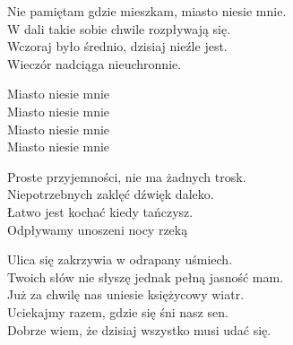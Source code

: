 \begin{text}
    Nie pamiętam gdzie mieszkam, miasto niesie mnie.\\
    W dali takie sobie chwile rozpływają się.\\
    Wczoraj było średnio, dzisiaj nieźle jest.\\
    Wieczór nadciąga nieuchronnie.

    \vin Miasto niesie mnie\\
    \vin Miasto niesie mnie\\
    \vin Miasto niesie mnie\\
    \vin Miasto niesie mnie

    Proste przyjemności, nie ma żadnych trosk.\\
    Niepotrzebnych zaklęć dźwięk daleko.\\
    Łatwo jest kochać kiedy tańczysz.\\
    Odpływamy unoszeni nocy rzeką

    Ulica się zakrzywia w odrapany uśmiech.\\
    Twoich słów nie słyszę jednak pełną jasność mam.\\
    Już za chwilę nas uniesie księżycowy wiatr.\\
    Uciekajmy razem, gdzie się śni nasz sen.\\
    Dobrze wiem, że dzisiaj wszystko musi udać się.
\end{text}
\begin{chord}

\end{chord}